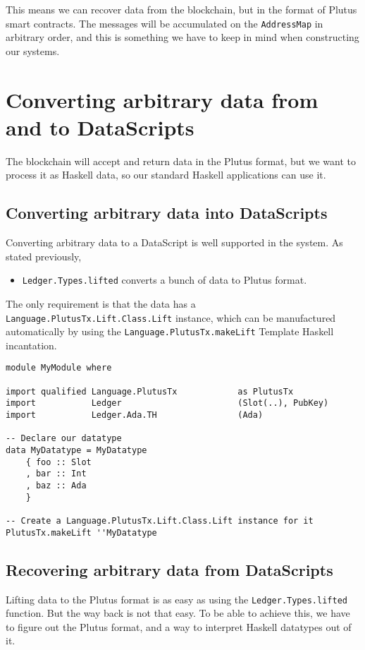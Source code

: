 \documentclass{article}
\begin{document}
This means we can recover data from the blockchain, but in the format of Plutus smart contracts. The messages will be accumulated on the \verb|AddressMap|\cite{address-map} in arbitrary order, and this is something we have to keep in mind when constructing our systems.

\section{Converting arbitrary data from and to DataScripts}
The blockchain will accept and return data in the Plutus format, but we want to process it as Haskell data, so our standard Haskell applications can use it.

\subsection{Converting arbitrary data into DataScripts}
Converting arbitrary data to a DataScript is well supported in the system. As stated previously,
\nopagebreak
\begin{itemize}
\item \verb|Ledger.Types.lifted| converts a bunch of data to Plutus format.
\end{itemize}

The only requirement is that the data has a \verb|Language.PlutusTx.Lift.Class.Lift| instance, which can be manufactured automatically by using the \verb|Language.PlutusTx.makeLift| Template Haskell incantation.
\nopagebreak
\begin{verbatim}
module MyModule where

import qualified Language.PlutusTx            as PlutusTx
import           Ledger                       (Slot(..), PubKey)
import           Ledger.Ada.TH                (Ada)

-- Declare our datatype
data MyDatatype = MyDatatype
    { foo :: Slot
    , bar :: Int
    , baz :: Ada
    }

-- Create a Language.PlutusTx.Lift.Class.Lift instance for it
PlutusTx.makeLift ''MyDatatype
\end{verbatim}

\subsection{Recovering arbitrary data from DataScripts}
Lifting data to the Plutus format is as easy as using the \verb|Ledger.Types.lifted| function. But the way back is not that easy. To be able to achieve this, we have to figure out the Plutus format, and a way to interpret Haskell datatypes out of it.
\end{document}
